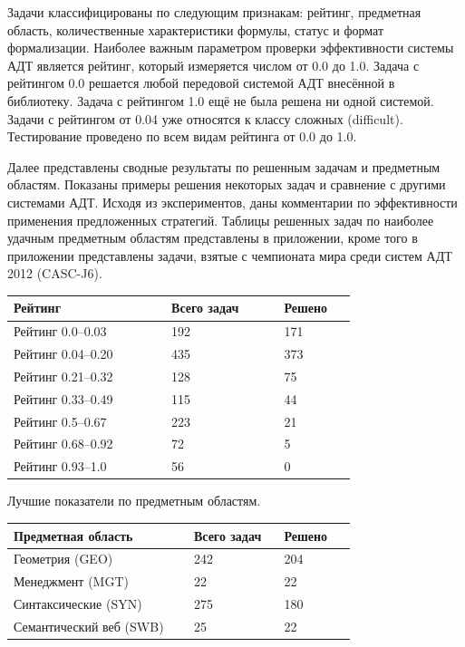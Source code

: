 \documentclass[a4paper]{report}
\begin{document}
Задачи классифицированы по следующим признакам: рейтинг, предметная область, количественные характеристики формулы, статус и формат формализации. Наиболее важным параметром проверки эффективности системы АДТ является рейтинг, который измеряется числом от 0.0 до 1.0. Задача с рейтингом 0.0 решается любой передовой системой АДТ внесённой в библиотеку. Задача с рейтингом 1.0 ещё не была решена ни одной системой. Задачи с рейтингом от 0.04 уже относятся к классу сложных (difficult). Тестирование проведено по всем видам рейтинга от 0.0 до 1.0.

Далее представлены сводные результаты по решенным задачам и предметным областям. Показаны примеры решения некоторых задач и сравнение с другими системами АДТ. Исходя из экспериментов, даны комментарии по эффективности применения предложенных стратегий. Таблицы решенных задач по наиболее удачным предметным областям представлены в приложении, кроме того в приложении представлены задачи, взятые с чемпионата мира среди систем АДТ 2012 (CASC-J6).



{\small{}
\begin{longtable}[H]{|p{0.35\linewidth}|p{0.25\linewidth}|p{0.15\linewidth}|}
\hline
\textbf{Рейтинг} & \textbf{Всего задач} & \textbf{Решено} \\
\hline
Рейтинг 0.0--0.03 & 192 & 171 \\
\hline
Рейтинг 0.04--0.20 & 435 & 373 \\
\hline
Рейтинг 0.21--0.32 & 128 & 75 \\
\hline
Рейтинг 0.33--0.49 & 115 & 44 \\
\hline
Рейтинг 0.5--0.67 & 223 & 21 \\
\hline
Рейтинг 0.68--0.92 & 72 & 5 \\
\hline
Рейтинг 0.93--1.0 & 56 & 0\\
\hline
\end{longtable}
}

Лучшие показатели по предметным областям.

{\small{}
\begin{longtable}[H]{|p{0.4\linewidth}|p{0.2\linewidth}|p{0.15\linewidth}|}
\hline
\textbf{Предметная область} & \textbf{Всего задач} & \textbf{Решено} \\
\hline
Геометрия (GEO) & 242 & 204 \\
\hline
Менеджмент (MGT) & 22 & 22 \\
\hline
Синтаксические (SYN) & 275 & 180 \\
\hline
Семантический веб (SWB) & 25 & 22 \\
\hline
\end{longtable}
}
\end{document}
